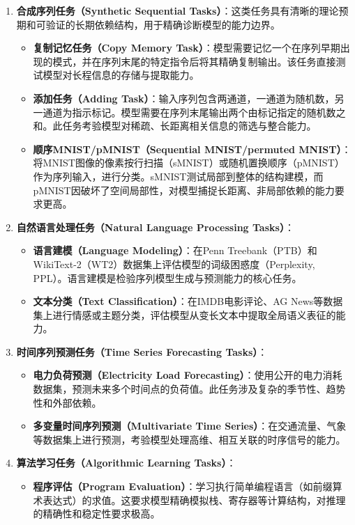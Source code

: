 \documentclass[
  12pt,
]{article}
\providecommand{\tightlist}{%
  \setlength{\itemsep}{0pt}\setlength{\parskip}{0pt}}
\begin{document}
\begin{enumerate}
\def\labelenumi{\arabic{enumi}.}
\tightlist
\item
  \textbf{合成序列任务（Synthetic Sequential
  Tasks）}：这类任务具有清晰的理论预期和可验证的长期依赖结构，用于精确诊断模型的能力边界。

  \begin{itemize}
  \tightlist
  \item
    \textbf{复制记忆任务（Copy Memory
    Task）}：模型需要记忆一个在序列早期出现的模式，并在序列末尾的特定指令后将其精确复制输出。该任务直接测试模型对长程信息的存储与提取能力。
  \item
    \textbf{添加任务（Adding
    Task）}：输入序列包含两通道，一通道为随机数，另一通道为指示标记。模型需要在序列末尾输出两个由标记指定的随机数之和。此任务考验模型对稀疏、长距离相关信息的筛选与整合能力。
  \item
    \textbf{顺序MNIST/pMNIST（Sequential MNIST/permuted
    MNIST）}：将MNIST图像的像素按行扫描（sMNIST）或随机置换顺序（pMNIST）作为序列输入，进行分类。sMNIST测试局部到整体的结构建模，而pMNIST因破坏了空间局部性，对模型捕捉长距离、非局部依赖的能力要求更高。
  \end{itemize}
\item
  \textbf{自然语言处理任务（Natural Language Processing Tasks）}：

  \begin{itemize}
  \tightlist
  \item
    \textbf{语言建模（Language Modeling）}：在Penn
    Treebank（PTB）和WikiText-2（WT2）数据集上评估模型的词级困惑度（Perplexity,
    PPL）。语言建模是检验序列模型生成与预测能力的核心任务。
  \item
    \textbf{文本分类（Text Classification）}：在IMDB电影评论、AG
    News等数据集上进行情感或主题分类，评估模型从变长文本中提取全局语义表征的能力。
  \end{itemize}
\item
  \textbf{时间序列预测任务（Time Series Forecasting Tasks）}：

  \begin{itemize}
  \tightlist
  \item
    \textbf{电力负荷预测（Electricity Load
    Forecasting）}：使用公开的电力消耗数据集，预测未来多个时间点的负荷值。此任务涉及复杂的季节性、趋势性和外部依赖。
  \item
    \textbf{多变量时间序列预测（Multivariate Time
    Series）}：在交通流量、气象等数据集上进行预测，考验模型处理高维、相互关联的时序信号的能力。
  \end{itemize}
\item
  \textbf{算法学习任务（Algorithmic Learning Tasks）}：

  \begin{itemize}
  \tightlist
  \item
    \textbf{程序评估（Program
    Evaluation）}：学习执行简单编程语言（如前缀算术表达式）的求值。这要求模型精确模拟栈、寄存器等计算结构，对推理的精确性和稳定性要求极高。
  \end{itemize}
\end{enumerate}
\end{document}
